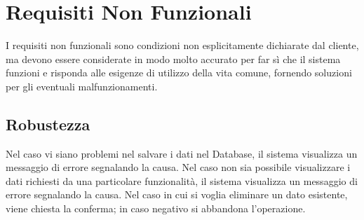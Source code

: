 \documentclass[a4paper,12pt]{article}
\begin{document}
\begin{center}
\end{center}

\pagebreak

\section{Requisiti Non Funzionali}
I requisiti non funzionali sono condizioni non esplicitamente dichiarate dal cliente, ma devono essere considerate in modo molto accurato per far sì che il sistema funzioni e risponda alle esigenze di utilizzo della vita comune, fornendo soluzioni per gli eventuali malfunzionamenti. 

\subsection{Robustezza}
Nel caso vi siano problemi nel salvare i dati nel Database, il sistema visualizza un messaggio di errore segnalando la causa. Nel caso non sia possibile visualizzare i dati richiesti da una particolare funzionalità, il sistema visualizza un messaggio di errore segnalando la causa. Nel caso in cui si voglia eliminare un dato esistente, viene chiesta la conferma; in caso negativo si abbandona l'operazione.
\end{document}
